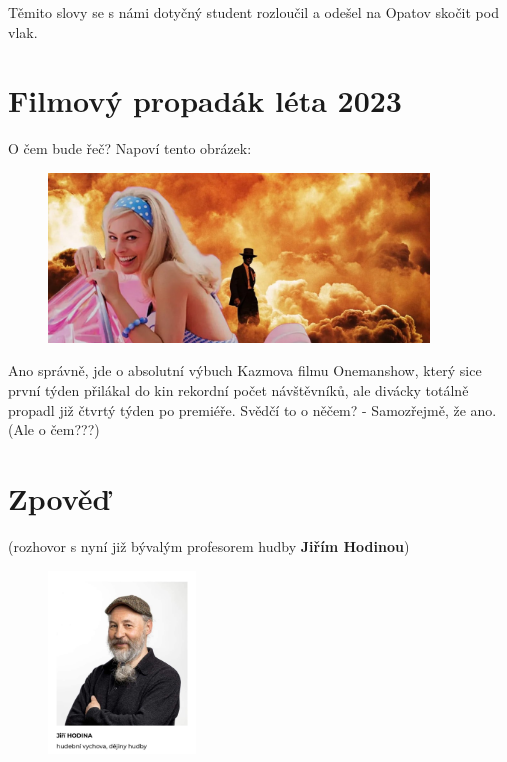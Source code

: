 \documentclass[twoside, 11pt]{article}
\begin{document}
Těmito slovy se s námi dotyčný student rozloučil a odešel na Opatov skočit pod vlak.

\section*{Filmový propadák léta 2023}
O čem bude řeč? Napoví tento obrázek:

\begin{figure}[htbp]
    \centering
    \includegraphics[width=0.9\textwidth]{barbie}
\end{figure}
\vspace*{-12pt}
{\scriptsize Ano správně, jde o absolutní výbuch Kazmova filmu Onemanshow, který sice první týden přilákal do kin rekordní počet návštěvníků, ale divácky totálně propadl již čtvrtý týden po premiéře. Svědčí to o něčem? - Samozřejmě, že ano. (Ale o čem???)}
\clearpage

\section*{Zpověď}
(rozhovor s nyní již bývalým profesorem hudby \textbf{Jiřím Hodinou})

\begin{figure}
    \vspace*{-4pt}
    \includegraphics[width=0.35\textwidth]{hodina}
\end{figure}
\end{document}
